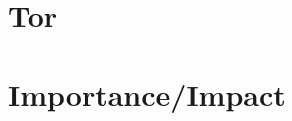 \documentclass[11pt,twocolumn,a4paper,DIV=calc]{scrartcl}
\begin{document}


\section{Tor}



\section{Importance/Impact}



\end{document}
